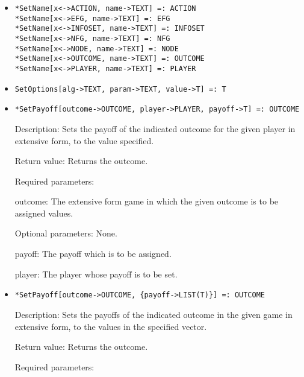 \begin{itemize}
\item
\protect \large \begin{verbatim}
*SetName[x<->ACTION, name->TEXT] =: ACTION
*SetName[x<->EFG, name->TEXT] =: EFG
*SetName[x<->INFOSET, name->TEXT] =: INFOSET
*SetName[x<->NFG, name->TEXT] =: NFG
*SetName[x<->NODE, name->TEXT] =: NODE
*SetName[x<->OUTCOME, name->TEXT] =: OUTCOME
*SetName[x<->PLAYER, name->TEXT] =: PLAYER
\end{verbatim}\normalsize

\item
\protect \large \begin{verbatim}
SetOptions[alg->TEXT, param->TEXT, value->T] =: T
\end{verbatim}\normalsize

\item
\protect \large \begin{verbatim}
*SetPayoff[outcome->OUTCOME, player->PLAYER, payoff->T] =: OUTCOME
\end{verbatim}\normalsize

\bd
\item
[Description:] Sets the payoff  of the indicated outcome for the given
player in extensive form, to the value specified.
\item
[Return value:] Returns the outcome.
\item
[Required parameters:]\hfil\null
	
\bd
\item
[outcome:] The extensive form game in which the given outcome is to be
assigned values.
\ed

\item
[Optional parameters:] None.
\bd
\item
[payoff:] The payoff which is to be assigned.
\item
[player:] The player whose payoff is to be set.  
\ed
\ed

\item
\protect \large \begin{verbatim}
*SetPayoff[outcome->OUTCOME, {payoff->LIST(T)}] =: OUTCOME
\end{verbatim}\normalsize

\bd
\item
[Description:] Sets the payoffs  of the indicated outcome in the given
game in extensive form, to the values in the specified vector.
\item
[Return value:] Returns the outcome.
\item
[Required parameters:]\hfil\null
	

\end{itemize}
